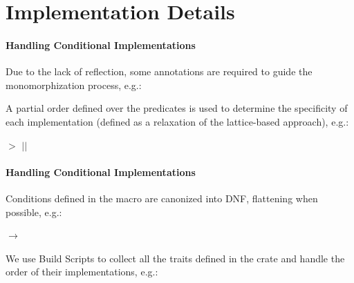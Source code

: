 \section{Implementation Details}\label{sec:implementation_details}

\begin{frame}{\secname}
	\framesubtitle{Handling Conditional Implementations}


	Due to the lack of reflection, some \alert{annotations} are required to guide the monomorphization process, e.g.:

	\smallskip

	{\footnotesize{}}

	\bigskip
	\bigskip

	A \alert{partial order} defined over the predicates is used to determine the specificity of each implementation (defined as a relaxation of the lattice-based approach), e.g.:

	\smallskip

	{\footnotesize{} $>$  $||$ }
\end{frame}


\begin{frame}{\secname}
	\framesubtitle{Handling Conditional Implementations}

	Conditions defined in the  macro are canonized into \alert{DNF}, %
	flattening when possible, e.g.:

	\smallskip

	{\footnotesize{} $\rightarrow$ }

	\bigskip
	\bigskip

	We use \alert{Build Scripts} to collect all the traits defined in the crate %
	and handle the order of their implementations, %
	e.g.:

	\smallskip

	{\footnotesize{}}

\end{frame}